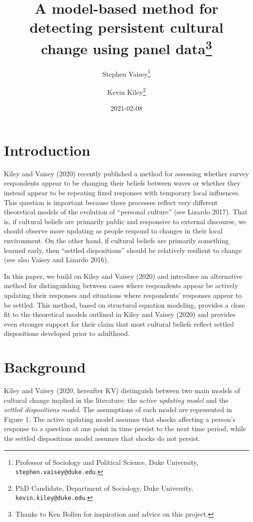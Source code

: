 \documentclass[
  11pt,
]{article}
\title{A model-based method for detecting persistent cultural change using panel data\footnote{Thanks to Ken Bollen for inspiration and advice on this project.}}
\author{Stephen Vaisey\footnote{Professor of Sociology and Political Science, Duke University, \texttt{stephen.vaisey@duke.edu}.} \and Kevin Kiley\footnote{PhD Candidate, Department of Sociology, Duke University, \texttt{kevin.kiley@duke.edu}.}}
\date{2021-02-08}
\begin{document}
\maketitle

\hypertarget{introduction}{%
\section{Introduction}\label{introduction}}

Kiley and Vaisey (2020) recently published a method for assessing whether survey respondents appear to be changing their beliefs between waves or whether they instead appear to be repeating fixed responses with temporary local influences. This question is important because these processes reflect very different theoretical models of the evolution of ``personal culture'' (see Lizardo 2017). That is, if cultural beliefs are primarily public and responsive to external discourse, we should observe more updating as people respond to changes in their local environment. On the other hand, if cultural beliefs are primarily something learned early, then ``settled dispositions'' should be relatively resilient to change (see also Vaisey and Lizardo 2016).

In this paper, we build on Kiley and Vaisey (2020) and introduce an alternative method for distinguishing between cases where respondents appear be actively updating their responses and situations where respondents' responses appear to be settled. This method, based on structural equation modeling, provides a close fit to the theoretical models outlined in Kiley and Vaisey (2020) and provides even stronger support for their claim that most cultural beliefs reflect settled dispositions developed prior to adulthood.

\hypertarget{background}{%
\section{Background}\label{background}}

Kiley and Vaisey (2020, hereafter KV) distinguish between two main models of cultural change implied in the literature: the \emph{active updating model} and the \emph{settled dispositions model}. The assumptions of each model are represented in Figure 1. The active updating model assumes that shocks affecting a person's response to a question at one point in time persist to the next time period, while the settled dispositions model assumes that shocks do not persist.
\end{document}
